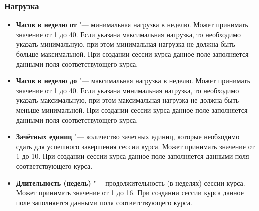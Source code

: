 \subsubsection{Нагрузка}
	\begin{itemize}
		\item \textbf{Часов в неделю от} "--- минимальная нагрузка в неделю. Может принимать значение от 1 до 40. Если указана максимальная нагрузка, то необходимо указать минимальную, при этом минимальная нагрузка не должна быть больше максимальной. При создании сессии курса данное поле заполняется данными поля  соответствующего курса.
		
		\item \textbf{Часов в неделю до} "--- максимальная нагрузка в неделю. Может принимать значение от 1 до 40. Если указана минимальная нагрузка, то необходимо указать максимальную, при этом максимальная нагрузка не должна быть меньше минимальной. При создании сессии курса данное поле заполняется данными поля  соответствующего курса.
		
		\item \textbf{Зачётных единиц} "--- количество зачетных единиц, которые необходимо сдать для успешного завершения сессии курса. Может принимать значение от 1 до 10. При создании сессии курса данное поле заполняется данными поля  соответствующего курса.
		
		\item \textbf{Длительность (недель)} "--- продолжительность (в неделях) сессии курса. Может принимать значение от 1 до 16. При создании сессии курса данное поле заполняется данными поля  соответствующего курса.
	\end{itemize}
	
